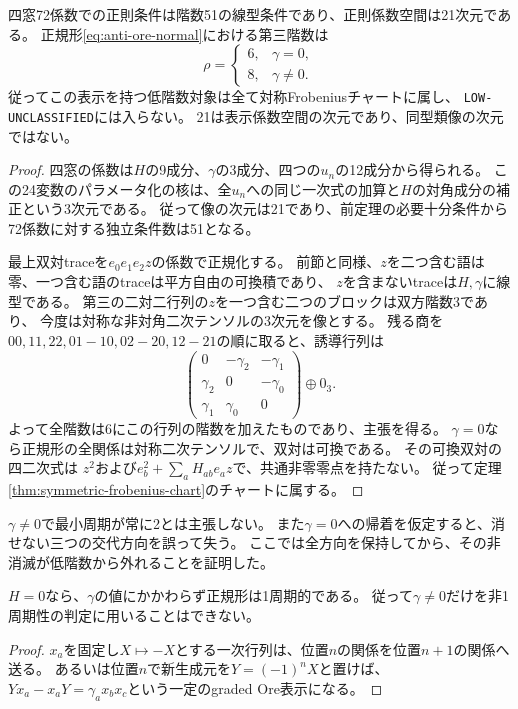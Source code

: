 \begin{proposition}[反可換Ore四窓の係数空間と第三階数]\label{prop:anticommutative-ore-rank}
四窓72係数での正則条件は階数51の線型条件であり、正則係数空間は21次元である。
正規形\eqref{eq:anti-ore-normal}における第三階数は
\[
 \rho=\begin{cases}6,&\gamma=0,\\8,&\gamma\ne0.\end{cases}
\]
従ってこの表示を持つ低階数対象は全て対称Frobeniusチャートに属し、
\texttt{LOW-UNCLASSIFIED}には入らない。
21は表示係数空間の次元であり、同型類像の次元ではない。
\end{proposition}
\begin{proof}
四窓の係数は$H$の9成分、$\gamma$の3成分、四つの$u_n$の12成分から得られる。
この24変数のパラメータ化の核は、全$u_n$への同じ一次式の加算と$H$の対角成分の補正という3次元である。
従って像の次元は21であり、前定理の必要十分条件から72係数に対する独立条件数は51となる。

最上双対traceを$e_0e_1e_2z$の係数で正規化する。
前節と同様、$z$を二つ含む語は零、一つ含む語のtraceは平方自由の可換積であり、
$z$を含まないtraceは$H,\gamma$に線型である。
第三の二対二行列の$z$を一つ含む二つのブロックは双方階数3であり、
今度は対称な非対角二次テンソルの3次元を像とする。
残る商を$00,11,22,01-10,02-20,12-21$の順に取ると、誘導行列は
\[
 \begin{pmatrix}
 0&-\gamma_2&-\gamma_1\\
 \gamma_2&0&-\gamma_0\\
 \gamma_1&\gamma_0&0
 \end{pmatrix}\oplus0_3.
\]
よって全階数は6にこの行列の階数を加えたものであり、主張を得る。
$\gamma=0$なら正規形の全関係は対称二次テンソルで、双対は可換である。
その可換双対の四二次式は
$z^2$および$e_b^2+\sum_aH_{ab}e_az$で、共通非零零点を持たない。
従って定理\ref{thm:symmetric-frobenius-chart}のチャートに属する。
\end{proof}
\begin{remark}
$\gamma\ne0$で最小周期が常に2とは主張しない。
また$\gamma=0$への帰着を仮定すると、消せない三つの交代方向を誤って失う。
ここでは全方向を保持してから、その非消滅が低階数から外れることを証明した。
\end{remark}

\begin{corollary}\label{cor:anti-ore-pure-outer-period}
$H=0$なら、$\gamma$の値にかかわらず正規形は1周期的である。
従って$\gamma\ne0$だけを非1周期性の判定に用いることはできない。
\end{corollary}
\begin{proof}
$x_a$を固定し$X\mapsto-X$とする一次行列は、位置$n$の関係を位置$n+1$の関係へ送る。
あるいは位置$n$で新生成元を$Y=(-1)^nX$と置けば、
$Yx_a-x_aY=\gamma_a x_bx_c$という一定のgraded Ore表示になる。
\end{proof}

